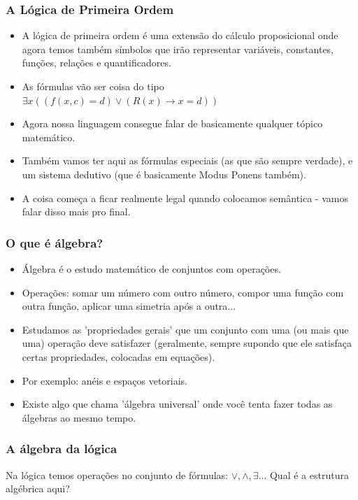 \begin{frame}{}
\frametitle{A Lógica de Primeira Ordem}
\pause
\begin{itemize}
\item A lógica de primeira ordem é uma extensão do cálculo proposicional onde agora temos também símbolos que irão representar variáveis, constantes, funções, relações e quantificadores. \pause
\item As fórmulas vão ser coisa do tipo $\exists x ((f(x,c) = d) \vee (R(x) \rightarrow x = d))$ \pause
\item Agora nossa linguagem consegue falar de basicamente qualquer tópico matemático. \pause
\item Também vamos ter aqui as fórmulas especiais (as que são sempre verdade), e um sistema dedutivo (que é basicamente Modus Ponens também). \pause
\item A coisa começa a ficar realmente legal quando colocamos semântica - vamos falar disso mais pro final.
\end{itemize}
\end{frame}

\begin{frame}{}
\frametitle{O que é álgebra?}
\pause
\begin{itemize}
    \item Álgebra é o estudo matemático de conjuntos com operações. \pause
    \item Operações: somar um número com outro número, compor uma função com outra função, aplicar uma simetria após a outra... \pause 
    \item Estudamos as 'propriedades gerais' que um conjunto com uma (ou mais que uma) operação deve satisfazer (geralmente, sempre supondo que ele satisfaça certas propriedades, colocadas em equações).\pause
    \item Por exemplo: anéis e espaços vetoriais. \pause
    \item Existe algo que chama 'álgebra universal' onde você tenta fazer todas as álgebras ao mesmo tempo.
\end{itemize}
\end{frame}

\begin{frame}{}
\frametitle{A álgebra da lógica}
Na lógica temos operações no conjunto de fórmulas: $\vee, \wedge, \exists$... Qual é a estrutura algébrica aqui?
\end{frame}

